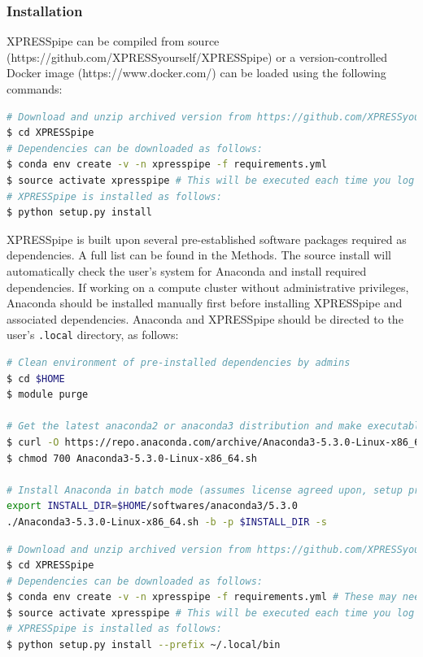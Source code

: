 \documentclass[11pt, a4paper, oneside]{article}
\begin{document}
\newline

\subsubsection{Installation}
XPRESSpipe can be compiled from source (https://github.com/XPRESSyourself/XPRESSpipe) or a version-controlled Docker image (https://www.docker.com/) can be loaded using the following commands: \par

\begin{lstlisting}[language=bash, caption=Source installation.]
# Download and unzip archived version from https://github.com/XPRESSyourself/XPRESSpipe/releases
$ cd XPRESSpipe
# Dependencies can be downloaded as follows:
$ conda env create -v -n xpresspipe -f requirements.yml
$ source activate xpresspipe # This will be executed each time you log back into the command line
# XPRESSpipe is installed as follows:
$ python setup.py install
\end{lstlisting}

XPRESSpipe is built upon several pre-established software packages required as dependencies. A full list can be found in the Methods. The source install will automatically check the user's system for Anaconda\cite{anaconda} and install required dependencies. If working on a compute cluster without administrative privileges, Anaconda should be installed manually first before installing XPRESSpipe and associated dependencies. Anaconda and XPRESSpipe should be directed to the user's \texttt{.local} directory, as follows:

\begin{lstlisting}[language=bash, caption=Anaconda installation on compute node.]
# Clean environment of pre-installed dependencies by admins
$ cd $HOME
$ module purge

# Get the latest anaconda2 or anaconda3 distribution and make executable
$ curl -O https://repo.anaconda.com/archive/Anaconda3-5.3.0-Linux-x86_64.sh
$ chmod 700 Anaconda3-5.3.0-Linux-x86_64.sh

# Install Anaconda in batch mode (assumes license agreed upon, setup prefix directory, and skip pre- and post- install scripts)
export INSTALL_DIR=$HOME/softwares/anaconda3/5.3.0
./Anaconda3-5.3.0-Linux-x86_64.sh -b -p $INSTALL_DIR -s
\end{lstlisting}


\begin{lstlisting}[language=bash, caption=Source installation on compute node.]
# Download and unzip archived version from https://github.com/XPRESSyourself/XPRESSpipe/releases
$ cd XPRESSpipe
# Dependencies can be downloaded as follows:
$ conda env create -v -n xpresspipe -f requirements.yml # These may need to be installed manually to the user's profile depending on compute node setup
$ source activate xpresspipe # This will be executed each time you log back into the command line
# XPRESSpipe is installed as follows:
$ python setup.py install --prefix ~/.local/bin
\end{lstlisting}
\end{document}
